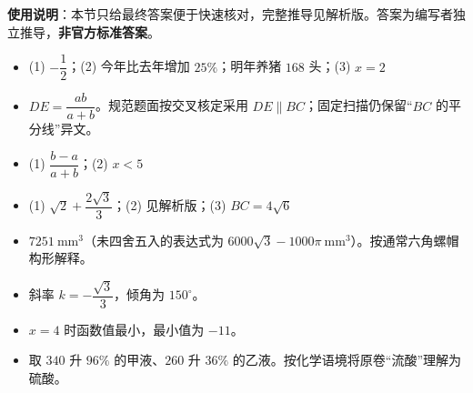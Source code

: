 
\begin{gknotice}
\textbf{使用说明}：本节只给最终答案便于快速核对，完整推导见解析版。答案为编写者独立推导，\textbf{非官方标准答案}。
\end{gknotice}

\begin{itemize}[leftmargin=2.6em]
  \item[\textbf{1.}] (1) $-\dfrac12$；(2) 今年比去年增加 $25\%$；明年养猪 $168$ 头；(3) $x=2$
  \item[\textbf{2.}] $DE=\dfrac{ab}{a+b}$。规范题面按交叉核定采用 $DE\parallel BC$；固定扫描仍保留“$BC$ 的平分线”异文。
  \item[\textbf{3.}] (1) $\dfrac{b-a}{a+b}$；(2) $x<5$
  \item[\textbf{4.}] (1) $\sqrt2+\dfrac{2\sqrt3}{3}$；(2) 见解析版；(3) $BC=4\sqrt6$
  \item[\textbf{5.}] $7251\ \mathrm{mm^3}$（未四舍五入的表达式为 $6000\sqrt3-1000\pi\ \mathrm{mm^3}$）。按通常六角螺帽构形解释。
  \item[\textbf{6.}] 斜率 $k=-\dfrac{\sqrt3}{3}$，倾角为 $150^\circ$。
  \item[\textbf{7.}] $x=4$ 时函数值最小，最小值为 $-11$。
  \item[\textbf{8.}] 取 $340$ 升 $96\%$ 的甲液、$260$ 升 $36\%$ 的乙液。按化学语境将原卷“流酸”理解为硫酸。
\end{itemize}
